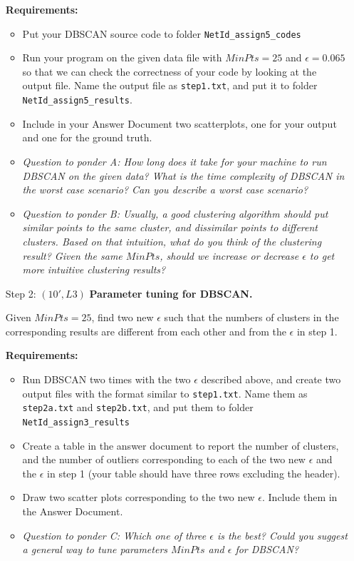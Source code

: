 \begin{enumerate}
\textbf{Requirements:}
\begin{itemize}
\item Put your DBSCAN source code to folder {\tt NetId\_assign5\_codes}
\item Run your program on the given data file with $MinPts=25$ and $\epsilon=0.065$ so that we can check the correctness of your code by looking at the output file. Name the output file as {\tt step1.txt}, and put it to folder {\tt NetId\_assign5\_results}.
\item Include in your Answer Document two scatterplots, one for your output and one for the ground truth.
\item \textit{Question to ponder A: How long does it take for your machine to run DBSCAN on the given data? What is the time complexity of DBSCAN in the worst case scenario? Can you describe a worst case scenario?}
\item \textit{Question to ponder B: Usually, a good clustering algorithm should put similar points to the same cluster, and dissimilar points to different clusters. Based on that intuition, what do you think of the clustering result? Given the same $MinPts$, should we increase or decrease $\epsilon$ to get more intuitive clustering results?}
\end{itemize}
  
\item[Step 2:] $(10', L3)$ \textbf{Parameter tuning for DBSCAN.}

Given $MinPts=25$, find two new $\epsilon$ such that the numbers of clusters in the corresponding results are different from each other and from the $\epsilon$ in step 1. 

\textbf{Requirements:}
\begin{itemize}
\item Run DBSCAN two times with the two $\epsilon$ described above, and create two output files with the format similar to {\tt step1.txt}. Name them as {\tt step2a.txt} and {\tt step2b.txt}, and put them to folder {\tt NetId\_assign3\_results}
\item Create a table in the answer document to report the number of clusters, and the number of outliers corresponding to each of the two new $\epsilon$ and the $\epsilon$ in step 1 (your table should have three rows excluding the header).
\item Draw two scatter plots corresponding to the two new $\epsilon$. Include them in the Answer Document.
\item \textit{Question to ponder C: Which one of three $\epsilon$ is the best? Could you suggest a general way to tune parameters $MinPts$ and $\epsilon$ for DBSCAN?}
\end{itemize}


\end{enumerate}
